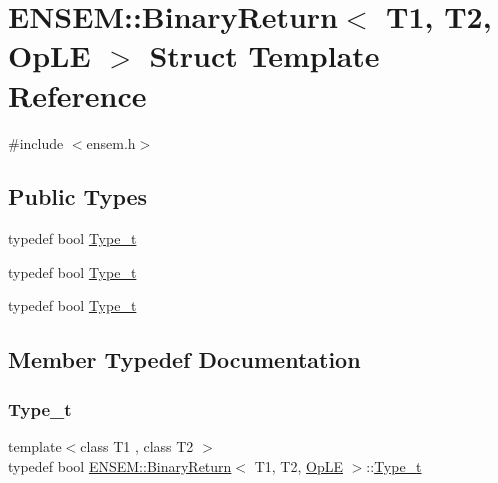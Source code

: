 \hypertarget{structENSEM_1_1BinaryReturn_3_01T1_00_01T2_00_01OpLE_01_4}{}\section{E\+N\+S\+EM\+:\+:Binary\+Return$<$ T1, T2, Op\+LE $>$ Struct Template Reference}
\label{structENSEM_1_1BinaryReturn_3_01T1_00_01T2_00_01OpLE_01_4}


{\ttfamily \#include $<$ensem.\+h$>$}

\subsection*{Public Types}
\begin{DoxyCompactItemize}
\item 
typedef bool \mbox{\hyperlink{structENSEM_1_1BinaryReturn_3_01T1_00_01T2_00_01OpLE_01_4_a052f794f01ea501a773007550e90886d}{Type\+\_\+t}}
\item 
typedef bool \mbox{\hyperlink{structENSEM_1_1BinaryReturn_3_01T1_00_01T2_00_01OpLE_01_4_a052f794f01ea501a773007550e90886d}{Type\+\_\+t}}
\item 
typedef bool \mbox{\hyperlink{structENSEM_1_1BinaryReturn_3_01T1_00_01T2_00_01OpLE_01_4_a052f794f01ea501a773007550e90886d}{Type\+\_\+t}}
\end{DoxyCompactItemize}


\subsection{Member Typedef Documentation}
\mbox{\label{structENSEM_1_1BinaryReturn_3_01T1_00_01T2_00_01OpLE_01_4_a052f794f01ea501a773007550e90886d}} 
\subsubsection{\texorpdfstring{Type\_t}{Type\_t}\hspace{0.1cm}{\footnotesize\ttfamily [1/3]}}
{\footnotesize\ttfamily template$<$class T1 , class T2 $>$ \\
typedef bool \mbox{\hyperlink{structENSEM_1_1BinaryReturn}{E\+N\+S\+E\+M\+::\+Binary\+Return}}$<$ T1, T2, \mbox{\hyperlink{structENSEM_1_1OpLE}{Op\+LE}} $>$\+::\mbox{\hyperlink{structENSEM_1_1BinaryReturn_3_01T1_00_01T2_00_01OpLE_01_4_a052f794f01ea501a773007550e90886d}{Type\+\_\+t}}}

